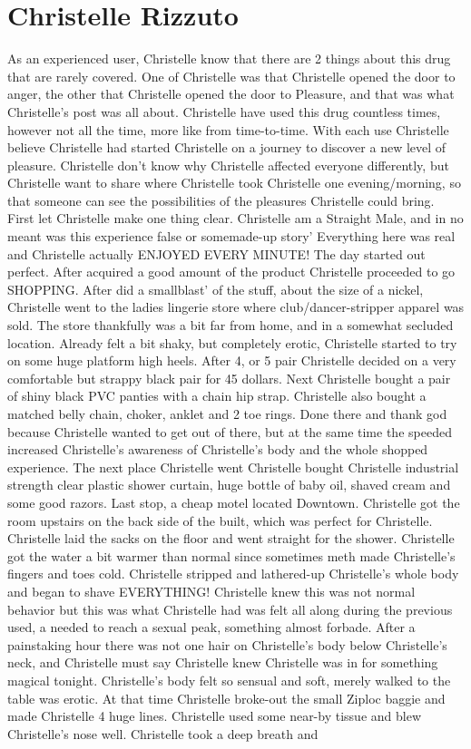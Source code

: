 \documentclass[12pt]{book}
\begin{document}
\chapter{Christelle Rizzuto}

As an experienced user, Christelle know that there are 2 things about this drug that are rarely covered. One of Christelle was that Christelle opened the door to anger, the other that Christelle opened the door to Pleasure, and that was what Christelle's post was all about. Christelle have used this drug countless times, however not all the time, more like from time-to-time. With each use Christelle believe Christelle had started Christelle on a journey to discover a new level of pleasure. Christelle don't know why Christelle affected everyone differently, but Christelle want to share where Christelle took Christelle one evening/morning, so that someone can see the possibilities of the pleasures Christelle could bring. First let Christelle make one thing clear. Christelle am a Straight Male, and in no meant was this experience false or somemade-up story' Everything here was real and Christelle actually ENJOYED EVERY MINUTE! The day started out perfect. After acquired a good amount of the product Christelle proceeded to go SHOPPING. After did a smallblast' of the stuff, about the size of a nickel, Christelle went to the ladies lingerie store where club/dancer-stripper apparel was sold. The store thankfully was a bit far from home, and in a somewhat secluded location. Already felt a bit shaky, but completely erotic, Christelle started to try on some huge platform high heels. After 4, or 5 pair Christelle decided on a very comfortable but strappy black pair for 45 dollars. Next Christelle bought a pair of shiny black PVC panties with a chain hip strap. Christelle also bought a matched belly chain, choker, anklet and 2 toe rings. Done there and thank god because Christelle wanted to get out of there, but at the same time the speeded increased Christelle's awareness of Christelle's body and the whole shopped experience. The next place Christelle went Christelle bought Christelle industrial strength clear plastic shower curtain, huge bottle of baby oil, shaved cream and some good razors. Last stop, a cheap motel located Downtown. Christelle got the room upstairs on the back side of the built, which was perfect for Christelle. Christelle laid the sacks on the floor and went straight for the shower. Christelle got the water a bit warmer than normal since sometimes meth made Christelle's fingers and toes cold. Christelle stripped and lathered-up Christelle's whole body and began to shave EVERYTHING! Christelle knew this was not normal behavior but this was what Christelle had was felt all along during the previous used, a needed to reach a sexual peak, something almost forbade. After a painstaking hour there was not one hair on Christelle's body below Christelle's neck, and Christelle must say Christelle knew Christelle was in for something magical tonight. Christelle's body felt so sensual and soft, merely walked to the table was erotic. At that time Christelle broke-out the small Ziploc baggie and made Christelle 4 huge lines. Christelle used some near-by tissue and blew Christelle's nose well. Christelle took a deep breath and 
\end{document}
